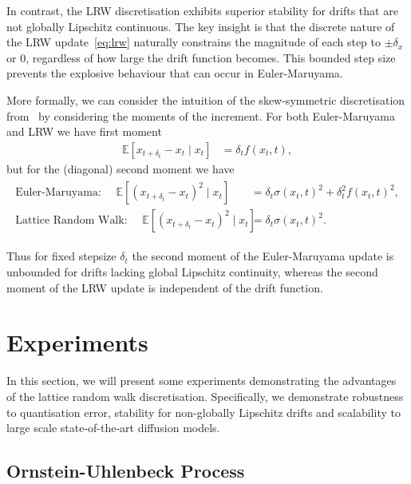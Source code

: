 \documentclass[pra,showpacs,amsmath,amssymb,amsfonts,lengthcheck,longbibliography,onecolumn]{revtex4-2}
\newcommand{\samd}[1]{{\color[RGB]{250, 0, 250}{SD: #1}}}
\newcommand{\E}{\mathbb{E}}
\begin{document}
In contrast, the LRW discretisation exhibits superior stability for drifts that are not globally Lipschitz continuous. 
The key insight is that the discrete nature of the LRW update~\eqref{eq:lrw} naturally constrains the magnitude 
of each step to $\pm\delta_x$ or $0$, regardless of how large the drift function becomes. This bounded step 
size prevents the explosive behaviour that can occur in Euler-Maruyama.

More formally, we can consider the intuition of the skew-symmetric discretisation from~\cite{iguchi2024skew}
by considering the moments of the increment. For both Euler-Maruyama and LRW we have first moment
\begin{align*}
    \E[x_{t+\delta_t} - x_t \mid x_t] &= \delta_t f(x_t, t),
\end{align*}
but for the (diagonal) second moment we have
\begin{align}\label{eq:second_moment}
  \begin{split}
    \text{Euler-Maruyama: } 
    \quad \E[(x_{t+\delta_t} - x_t)^2 \mid x_t] &= \delta_t\sigma(x_t, t)^2  + \delta_t^2 f(x_t, t)^2, \\
    \text{Lattice Random Walk: } \quad \E[(x_{t+\delta_t} - x_t)^2 \mid x_t] &= \delta_t\sigma(x_t, t)^2.
  \end{split}
\end{align}

Thus for fixed stepsize $\delta_t$ the second moment of the Euler-Maruyama update
is unbounded for drifts lacking global Lipschitz continuity, whereas the second moment of the LRW update
is independent of the drift function.



\section{Experiments}\label{sec:experiments}

In this section, we will present some experiments demonstrating the advantages of the lattice random walk
discretisation. Specifically, we demonstrate robustness to quantisation error, stability for non-globally Lipschitz drifts
and scalability to large scale state-of-the-art diffusion models.


\subsection{Ornstein-Uhlenbeck Process}\label{subsec:exp_ou}
\end{document}
